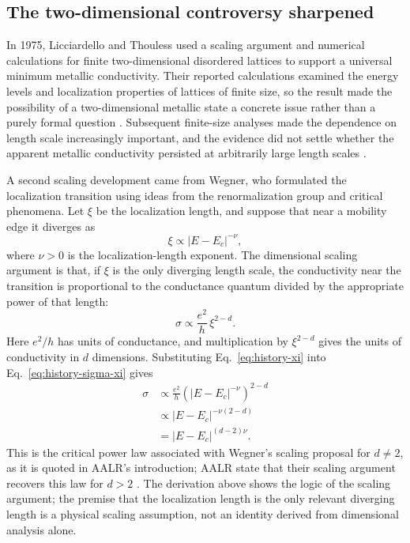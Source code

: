 \documentclass[11pt,a4paper]{article}
\numberwithin{equation}{section}
\begin{document}
\subsection{The two-dimensional controversy sharpened}

In 1975, Licciardello and Thouless used a scaling argument and numerical
calculations for finite two-dimensional disordered lattices to support a
universal minimum metallic conductivity. Their reported calculations
examined the energy levels and localization properties of lattices of
finite size, so the result made the possibility of a two-dimensional
metallic state a concrete issue rather than a purely formal question
\cite{LicciardelloThouless1975PRL,LicciardelloThouless1975JPC}. Subsequent
finite-size analyses made the dependence on length scale increasingly
important, and the evidence did not settle whether the apparent metallic
conductivity persisted at arbitrarily large length scales
\cite{LicciardelloThouless1978,AALR1979,LeeRamakrishnan1985}.

A second scaling development came from Wegner, who formulated the
localization transition using ideas from the renormalization group and
critical phenomena. Let $\xi$ be the localization length, and suppose that
near a mobility edge it diverges as
\begin{equation}
    \xi \propto |E-E_c|^{-\nu},
    \label{eq:history-xi}
\end{equation}
where $\nu>0$ is the localization-length exponent. The dimensional
scaling argument is that, if $\xi$ is the only diverging length scale,
the conductivity near the transition is proportional to the conductance
quantum divided by the appropriate power of that length:
\begin{equation}
    \sigma \propto \frac{e^2}{h}\,\xi^{2-d}.
    \label{eq:history-sigma-xi}
\end{equation}
Here $e^2/h$ has units of conductance, and multiplication by
$\xi^{2-d}$ gives the units of conductivity in $d$ dimensions. Substituting
Eq.~\eqref{eq:history-xi} into Eq.~\eqref{eq:history-sigma-xi} gives
\begin{align}
    \sigma &\propto \frac{e^2}{h}
        \left(|E-E_c|^{-\nu}\right)^{2-d} \\
        &\propto |E-E_c|^{-\nu(2-d)} \\
        &= |E-E_c|^{(d-2)\nu}.
    \label{eq:history-wegner}
\end{align}
This is the critical power law associated with Wegner's scaling proposal
for $d\ne2$, as it is quoted in AALR's introduction; AALR state that their
scaling argument recovers this law for $d>2$ \cite{Wegner1976,AALR1979}.
The derivation above shows the logic of the scaling argument; the premise
that the localization length is the only relevant diverging length is a
physical scaling assumption, not an identity derived from dimensional
analysis alone.
\end{document}
